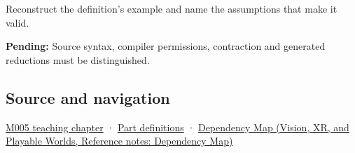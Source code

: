Reconstruct the definition's example and name the assumptions that make it valid.

\textbf{Pending:} Source syntax, compiler permissions, contraction and generated reductions must be distinguished.

\subsection{Source and navigation}\label{appendix-c2ac4a84c283-source-and-navigation}

\hyperref[01-foundations-i-ch001-when-arithmetic-meets-uncertainty]{M005 teaching chapter} · \hyperref[appendix-fd090d982a15-m005---parts-77-88]{Part definitions} · \href{../07-Vision-XR-and-Playable-Worlds/main.pdf\#nameddest=appendix-4ad47bdd269a}{Dependency Map (Vision, XR, and Playable Worlds, Reference notes: Dependency Map)}
